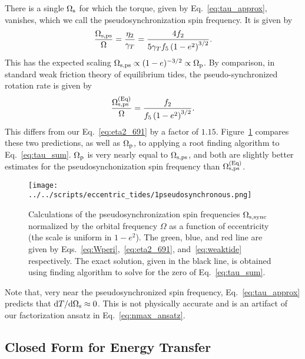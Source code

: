\documentclass[
        fleqn,
        usenatbib,
    ]{mnras}
\newcommand*{\rdil}[2]{\mathrm{d}#1 / \mathrm{d}#2}
\newcommand*{\p}[1]{\left(#1\right)}
\begin{document}
There is a single $\Omega_{\rm s}$ for which the torque, given by
Eq.~\eqref{eq:tau_approx}, vanishes, which we call the pseudosynchronization
spin frequency. It is given by
\begin{equation}
    \frac{\Omega_{\rm s, ps}}{\Omega} =
        \frac{\eta_2}{\gamma_T} = \frac{4f_2}{5\gamma_T f_5\p{1 -
        e^2}^{3/2}}.\label{eq:eta2_691}
\end{equation}
This has the expected scaling $\Omega_{\rm s, ps} \propto (1 - e)^{-3/2} \propto
\Omega_{\rm p}$. By comparison, in standard weak friction theory of equilibrium
tides, the pseudo-synchronized rotation rate is given by
\citep{alexander73, hut81}
\begin{equation}
    \frac{\Omega_{\rm s, ps}^{\rm (Eq)}}{\Omega} = \frac{f_2}{f_5\p{1 -
        e^2}^{3/2}}.\label{eq:weaktide}
\end{equation}
This differs from our Eq.~\eqref{eq:eta2_691} by a factor of $1.15$.
Figure~\ref{fig:pseudosync} compares these two predictions, as well as
$\Omega_{\rm p}$, to applying a root finding algorithm to
Eq.~\eqref{eq:tau_sum}. $\Omega_{\rm p}$ is very nearly equal to $\Omega_{\rm s,
ps}$, and both are slightly better estimates for the pseudosynchonization spin
frequency than $\Omega_{\rm s, ps}^{\rm (Eq)}$.
\begin{figure}
    \centering
    \texttt{[image: ../../scripts/eccentric\_tides/1pseudosynchronous.png]}
    \caption{Calculations of the pseudosynchronization spin frequencies
    $\Omega_{\rm s, sync}$ normalized by the orbital frequency $\Omega$ as a
    function of eccentricity (the scale is uniform in $1 - e^2$). The green,
    blue, and red line are given by Eqs.~\eqref{eq:Wperi},~\eqref{eq:eta2_691},
    and~\eqref{eq:weaktide} respectively. The exact solution, given in the black
    line, is obtained using finding algorithm to solve for the zero of
    Eq.~\eqref{eq:tau_sum}.}\label{fig:pseudosync}
\end{figure}

Note that, very near the pseudosynchronized spin frequency,
Eq.~\eqref{eq:tau_approx} predicts that $\rdil{T}{\Omega_{\rm s}} \approx 0$.
This is not physically accurate and is an artifact of our factorization ansatz
in Eq.~\eqref{eq:nmax_ansatz}.

\subsection{Closed Form for Energy Transfer}
\end{document}
